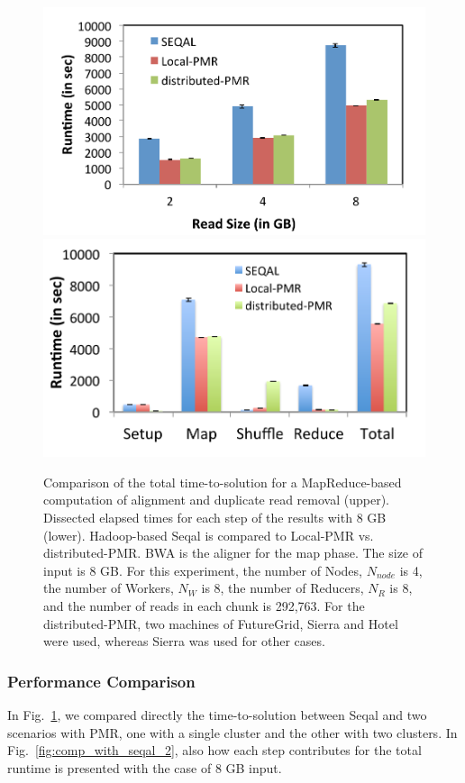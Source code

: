 \documentclass{acm_proc_article-sp}
\begin{document}
\begin{figure}
 \centering
\includegraphics[scale=0.50]{figures/seqalvslocalpmr.pdf}
\includegraphics[scale=0.52]{figures/8GB_phasewisetimes.pdf}

\caption{\small Comparison of the total time-to-solution for a MapReduce-based computation of alignment and duplicate read removal (upper).  Dissected elapsed times for each step of the results with 8 GB (lower). Hadoop-based Seqal is compared to Local-PMR vs. distributed-PMR.  BWA is the aligner for the map phase.  The size of input is 8 GB.  For this experiment, the number of Nodes, $N_{node}$ is 4, the number of Workers, $N_W$ is 8, the number of Reducers, $N_R$ is 8, and the number of reads in each chunk is 292,763. For the distributed-PMR, two machines of FutureGrid, Sierra and Hotel were used, whereas Sierra was used for other cases.}
  \label{fig:comp_with_seqal_1} 
\end{figure}

\subsubsection{Performance Comparison}
In Fig.~\ref{fig:comp_with_seqal_1}, we compared directly the time-to-solution between Seqal and two scenarios with PMR, one with a single cluster and the other with two clusters.  In Fig.~\ref{fig:comp_with_seqal_2}, also how each step contributes for the total runtime is presented with the case of 8 GB input.  
\end{document}
